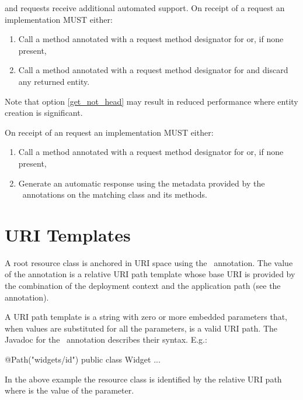  and  requests receive additional automated support. On receipt of a  request an implementation MUST either:

\begin{enumerate}
\item Call a method annotated with a request method designator for  or, if none present,
\item\label{get_not_head} Call a method annotated with a request method designator for  and discard any returned entity.
\end{enumerate}

Note that option \ref{get_not_head} may result in reduced performance where entity creation is significant.

On receipt of an  request an implementation MUST either:

\begin{enumerate}
\item Call a method annotated with a request method designator for  or, if none present,
\item Generate an automatic response using the metadata provided by the \jaxrs\ annotations on the matching class and its methods.
\end{enumerate}

\section{URI Templates}
\label{uritemplates}

A root resource class is anchored in URI space using the \Path\ annotation. The value of the annotation is a relative URI path template whose base URI is provided by the combination of the deployment context and the application path (see the  annotation).

A URI path template is a string with zero or more embedded parameters that, when values are substituted for all the parameters, is a valid URI\cite{uri} path. The Javadoc for the \Path\ annotation describes their syntax. E.g.:

\begin{listing}{1}
@Path("widgets/{id}")
public class Widget {
  ...
}\end{listing}

In the above example the  resource class is identified by the relative URI path  where  is the value of the  parameter.

